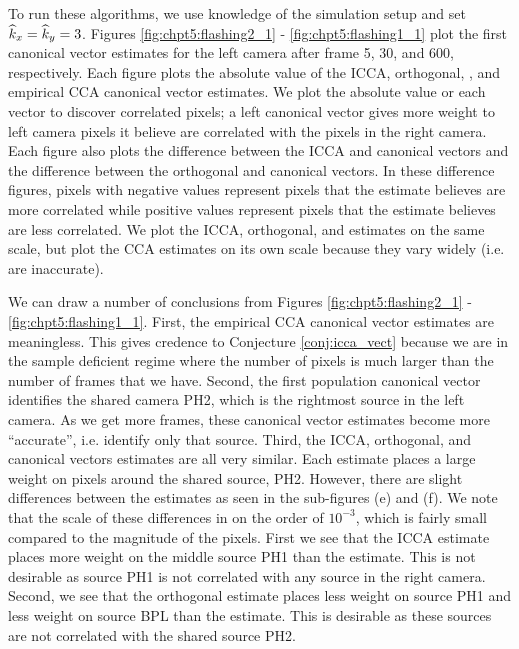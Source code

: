 To run these algorithms, we use knowledge of the simulation setup and set
$\widehat{k}_x=\widehat{k}_y=3$. Figures \ref{fig:chpt5:flashing2_1} - \ref{fig:chpt5:flashing1_1} plot
the first canonical vector estimates for the left camera after frame 5, 30, and 600,
respectively. Each figure plots the absolute value of the ICCA, orthogonal, \iccaps, and
empirical CCA canonical vector estimates. We plot the absolute value or each vector to
discover correlated pixels; a left canonical vector gives more weight to left camera
pixels it believe are correlated with the pixels in the right camera. Each figure also
plots the difference between the ICCA and \iccap canonical vectors and the difference
between the orthogonal and \iccap canonical vectors. In these difference figures, pixels
with negative values represent pixels that the \iccap estimate believes are more
correlated while positive values represent pixels that the \iccap estimate believes
are less correlated. We plot the ICCA, orthogonal, and \iccap estimates on the same
scale, but plot the CCA estimates on its own scale because they vary widely (i.e. are
inaccurate). 

We can draw a number of conclusions from Figures \ref{fig:chpt5:flashing2_1} -
\ref{fig:chpt5:flashing1_1}. First, the empirical CCA canonical vector estimates are
meaningless. This gives credence to Conjecture \ref{conj:icca_vect} because we are in the
sample deficient regime where the number of pixels is much larger than the number of
frames that we have. Second, the first population canonical vector identifies the shared
camera PH2, which is the rightmost source in the left camera. As we get more frames, these
canonical vector estimates become more ``accurate'', i.e. identify only that
source. Third, the ICCA, orthogonal, and \iccap canonical vectors estimates are all very
similar. Each estimate places a large weight on pixels around the shared source,
PH2. However, there are slight differences between the estimates as seen in the
sub-figures (e) and (f). We note that the scale of these differences in on the order of
$10^{-3}$, which is fairly small compared to the magnitude of the pixels. First we see
that the ICCA estimate places more weight on the middle source PH1 than the \iccap
estimate. This is not desirable as source PH1 is not correlated with any source in the
right camera. Second, we see that the orthogonal estimate places less weight on source PH1
and less weight on source BPL than the \iccap estimate. This is desirable as these
sources are not correlated with the shared source PH2.


